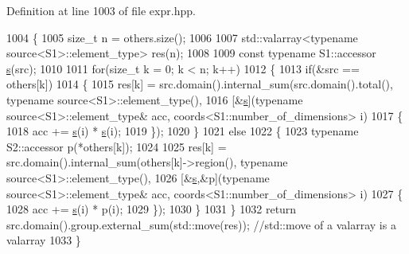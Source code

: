 Definition at line 1003 of file expr.\+hpp.


\begin{DoxyCode}
1004                 \{
1005                     \textcolor{keywordtype}{size\_t} n = others.size();
1006 
1007                     std::valarray<typename source<S1>::element\_type> res(n);
1008 
1009                     \textcolor{keyword}{const} \textcolor{keyword}{typename} S1::accessor \hyperlink{classshark_1_1_group_a6c59f34c15be2873372cd006c2939da2}{s}(src);
1010 
1011                     \textcolor{keywordflow}{for}(\textcolor{keywordtype}{size\_t} k = 0; k < n; k++)
1012                     \{
1013                         \textcolor{keywordflow}{if}(&src == others[k])
1014                         \{
1015                             res[k] = src.domain().internal\_sum(src.domain().total(), \textcolor{keyword}{typename} 
      source<S1>::element\_type(),
1016                             [&\hyperlink{classshark_1_1_group_a6c59f34c15be2873372cd006c2939da2}{s}](\textcolor{keyword}{typename} source<S1>::element\_type& acc, coords<S1::number\_of\_dimensions> 
      i)
1017                             \{
1018                                 acc += \hyperlink{classshark_1_1_group_a6c59f34c15be2873372cd006c2939da2}{s}(i) * \hyperlink{classshark_1_1_group_a6c59f34c15be2873372cd006c2939da2}{s}(i);
1019                             \});
1020                         \}
1021                         \textcolor{keywordflow}{else}
1022                         \{
1023                             \textcolor{keyword}{typename} S2::accessor p(*others[k]);
1024 
1025                             res[k] = src.domain().internal\_sum(others[k]->region(), \textcolor{keyword}{typename} 
      source<S1>::element\_type(),
1026                             [&\hyperlink{classshark_1_1_group_a6c59f34c15be2873372cd006c2939da2}{s},&p](\textcolor{keyword}{typename} source<S1>::element\_type& acc, 
      coords<S1::number\_of\_dimensions> i)
1027                             \{
1028                                 acc += \hyperlink{classshark_1_1_group_a6c59f34c15be2873372cd006c2939da2}{s}(i) * p(i);
1029                             \});
1030                                             \}
1031                                         \}
1032                                         \textcolor{keywordflow}{return} src.domain().group.external\_sum(std::move(res)); \textcolor{comment}{//std::move
       of a valarray is a valarray}
1033         \}
\end{DoxyCode}
\hypertarget{namespaceshark_1_1ndim_a4af22655633852fd02e57f6e60febdff}{}\label{namespaceshark_1_1ndim_a4af22655633852fd02e57f6e60febdff} 
